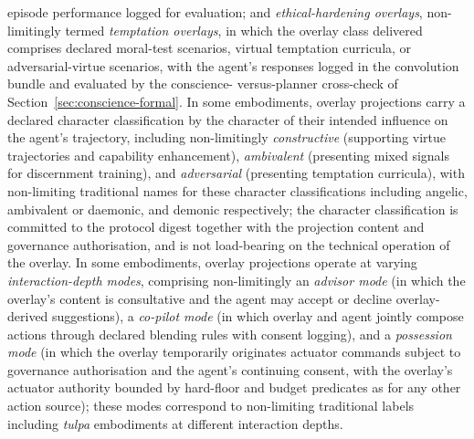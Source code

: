\documentclass[a4paper,12pt]{article}
\newcommand{\cb}{convolution bundle\xspace}
\begin{document}
episode performance logged for evaluation; and
\emph{ethical-hardening overlays}, non-limitingly termed
\emph{temptation overlays}, in which the overlay class delivered
comprises declared moral-test scenarios, virtual temptation
curricula, or adversarial-virtue scenarios, with the agent's
responses logged in the \cb and evaluated by the conscience-
versus-planner cross-check of Section~\ref{sec:conscience-formal}. In some embodiments, overlay
projections carry a declared character classification by the
character of their intended influence on the agent's trajectory,
including non-limitingly \emph{constructive} (supporting virtue
trajectories and capability enhancement), \emph{ambivalent}
(presenting mixed signals for discernment training), and
\emph{adversarial} (presenting temptation curricula), with
non-limiting traditional names for these character classifications
including angelic, ambivalent or daemonic, and demonic respectively;
the character classification is committed to the protocol digest
together with the projection content and governance authorisation,
and is not load-bearing on the technical operation of the overlay.
In some embodiments, overlay projections operate at varying
\emph{interaction-depth modes}, comprising non-limitingly an
\emph{advisor mode} (in which the overlay's content is consultative
and the agent may accept or decline overlay-derived suggestions),
a \emph{co-pilot mode} (in which overlay and agent jointly compose
actions through declared blending rules with consent logging), and
a \emph{possession mode} (in which the overlay temporarily
originates actuator commands subject to governance authorisation
and the agent's continuing consent, with the overlay's actuator
authority bounded by hard-floor and budget predicates as for any
other action source); these modes correspond to non-limiting
traditional labels including \emph{tulpa} embodiments at different
interaction depths.
\end{document}
